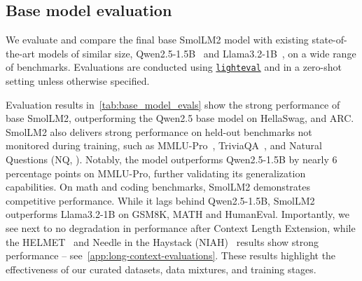\documentclass{article}
\theoremstyle{plain}
\theoremstyle{definition}
\theoremstyle{remark}
\begin{document}
\vspace{-0.25cm} 
\subsection{Base model evaluation}
\vspace{-0.1cm} 
\label{sec:evaluation-basemodels}
We evaluate and compare the final base SmolLM2 model with existing state-of-the-art models of similar size, Qwen2.5-1.5B~\cite{Yang2024Qwen2TR} and Llama3.2-1B~\cite{llama3.2}, on a wide range of benchmarks. Evaluations are conducted using \href{https://github.com/huggingface/lighteval/}{\texttt{lighteval}} and in a zero-shot setting unless otherwise specified.

\vspace{-0.05cm} 
Evaluation results in~\cref{tab:base_model_evals} show the strong performance of base SmolLM2, outperforming the Qwen2.5 base model on HellaSwag, and ARC. SmolLM2 also delivers strong performance on held-out benchmarks not monitored during training, such as MMLU-Pro~\citep{wang2024mmlu},  TriviaQA~\cite{joshi2017triviaqa}, and Natural Questions (NQ, \citealp{kwiatkowski2019natural}). Notably, the model outperforms Qwen2.5-1.5B by nearly 6 percentage points on MMLU-Pro, further validating its generalization capabilities.
On math and coding benchmarks, SmolLM2 demonstrates competitive performance. While it lags behind Qwen2.5-1.5B, SmolLM2 outperforms Llama3.2-1B on GSM8K, MATH and HumanEval. 
Importantly, we see next to no degradation in performance after Context Length Extension, while the HELMET~\cite{yen2024helmetevaluatelongcontextlanguage} and 
Needle in the Haystack (NIAH)~\cite{kamradt2024needle} results show strong performance -- see~\cref{app:long-context-evaluations}. These results highlight the effectiveness of our curated datasets, data mixtures, and training stages. 
\end{document}

